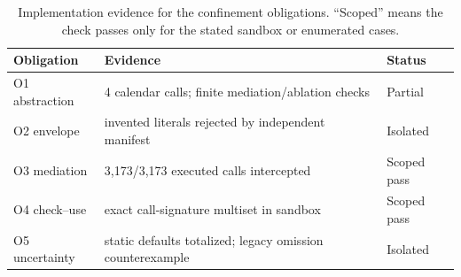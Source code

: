 \begin{table}[t]
\centering
\small
\caption{Implementation evidence for the confinement obligations. ``Scoped'' means the check passes only for the stated sandbox or enumerated cases.}
\label{tab:e80-obligations}
\begin{tabular}{@{}p{}p{}p{}@{}}
\toprule
Obligation & Evidence & Status \\
\midrule
O1 abstraction & 4 calendar calls; finite mediation/ablation checks & Partial \\
O2 envelope & invented literals rejected by independent manifest & Isolated \\
O3 mediation & 3,173/3,173 executed calls intercepted & Scoped pass \\
O4 check--use & exact call-signature multiset in sandbox & Scoped pass \\
O5 uncertainty & static defaults totalized; legacy omission counterexample & Isolated \\
\bottomrule
\end{tabular}
\end{table}
